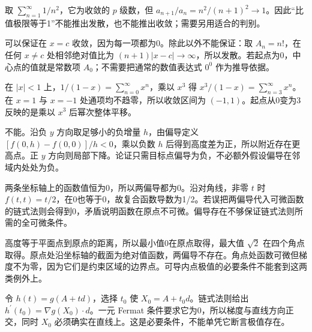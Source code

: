 \documentclass[12pt,fontset=fandol]{ctexart}
\begin{document}
\begin{solve}\label{ans:c45q12}
取 $\sum_{n=1}^\infty1/n^2$，它为收敛的 $p$ 级数，但 $a_{n+1}/a_n=n^2/(n+1)^2\to1$。因此“比值极限等于1”不能推出发散，也不能推出收敛；需要另用适合的判别。
\end{solve}

\begin{solve}\label{ans:c45q13}
可以保证在 $x=c$ 收敛，因为每一项都为0。除此以外不能保证：取 $A_n=n!$，在任何 $x\ne c$ 处相邻绝对值比为 $(n+1)|x-c|\to\infty$，所以发散。若起点为0，中心点的值就是常数项 $A_0$；不需要把通常的数值表达式 $0^0$ 作为推导依据。
\end{solve}

\begin{solve}\label{ans:c45q14}
在 $|x|<1$ 上，$1/(1-x)=\sum_{n=0}^\infty x^n$，乘以 $x^3$ 得 $x^3/(1-x)=\sum_{n=3}^\infty x^n$。在 $x=1$ 与 $x=-1$ 处通项均不趋零，所以收敛区间为 $(-1,1)$。起点从0变为3反映的是乘以 $x^3$ 后幂次整体平移。
\end{solve}

\begin{solve}\label{ans:c45q15}
不能。沿负 $y$ 方向取足够小的负增量 $h$，由偏导定义 $[f(0,h)-f(0,0)]/h<0$，乘以负数 $h$ 后得到高度差为正，所以附近存在更高点。正 $y$ 方向则局部下降。论证只需目标点偏导为负，不必额外假设偏导在邻域内处处为负。
\end{solve}

\begin{solve}\label{ans:c45q16}
两条坐标轴上的函数值恒为0，所以两偏导都为0。沿对角线，非零 $t$ 时 $f(t,t)=t/2$，在0也等于0，故复合函数导数为1/2。若误把两偏导代入可微函数的链式法则会得到0，矛盾说明函数在原点不可微。偏导存在不够保证链式法则所需的全可微条件。
\end{solve}

\begin{solve}\label{ans:c45q17}
高度等于平面点到原点的距离，所以最小值0在原点取得，最大值 $\sqrt2$ 在四个角点取得。原点处沿坐标轴的截面为绝对值函数，两偏导不存在。角点处函数可微但梯度不为零，因为它们是约束区域的边界点。可导内点极值的必要条件不能套到这两类例外上。
\end{solve}

\begin{solve}\label{ans:c45q18}
令 $h(t)=g(A+td)$，选择 $t_0$ 使 $X_0=A+t_0d$。链式法则给出 $h^{\prime}(t_0)=\nabla g(X_0)\cdot d$。一元 Fermat 条件要求它为0，所以梯度与直线方向正交，同时 $X_0$ 必须确实在直线上。这是必要条件，不能单凭它断言极值存在。
\end{solve}
\end{document}
